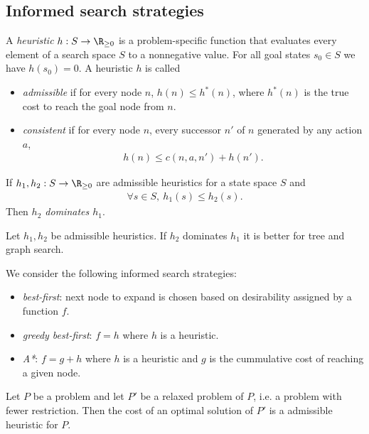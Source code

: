 \documentclass{article}
\begin{document}
\subsection{Informed search strategies}

\begin{definition}[R\&N p. 92]
    A \emph{heuristic} $h:S\to \R_{\geq 0}$ is a problem-specific function
    that evaluates every element of a search space $S$ to a nonnegative value.
    For all goal states $s_0\in S$ we have $h(s_0)=0$.
    A heuristic $h$ is called
    \begin{itemize}
        \item \emph{admissible} if for every node $n$, $h(n)\leq h^*(n)$,
        where $h^*(n)$ is the true cost to reach the goal node from $n$.
        \item \emph{consistent} if for every node $n$, every
        successor $n'$ of $n$ generated by any action $a$,
        \begin{align*}
            h(n) \leq c(n, a, n') + h(n').
        \end{align*}
    \end{itemize}
    If $h_1,h_2:S\to \R_{\geq 0}$ are admissible heuristics for a state
    space $S$ and
    \begin{align*}
        \forall s\in S,\: h_1(s) \leq h_2(s).
    \end{align*}
    Then \emph{$h_2$ dominates $h_1$}.
\end{definition}

\begin{theorem}
    Let $h_1,h_2$ be admissible heuristics. If $h_2$ dominates $h_1$ it is
    better for tree and graph search.
\end{theorem}

\begin{definition}
    We consider the following informed search strategies:
    \begin{itemize}
        \item \emph{best-first}: next node to expand is chosen based on desirability assigned by a function $f$.
        \item \emph{greedy best-first}: $f=h$ where $h$ is a heuristic.
        \item \emph{A*}: $f=g+h$ where $h$ is a heuristic and $g$ is the cummulative cost of reaching a given node.
    \end{itemize}
\end{definition}

\begin{theorem}
    Let $P$ be a problem and let $P'$ be a relaxed problem of $P$, i.e.
    a problem with fewer restriction. Then the cost of an optimal solution of 
    $P'$ is a admissible heuristic for $P$.
\end{theorem}
\end{document}
